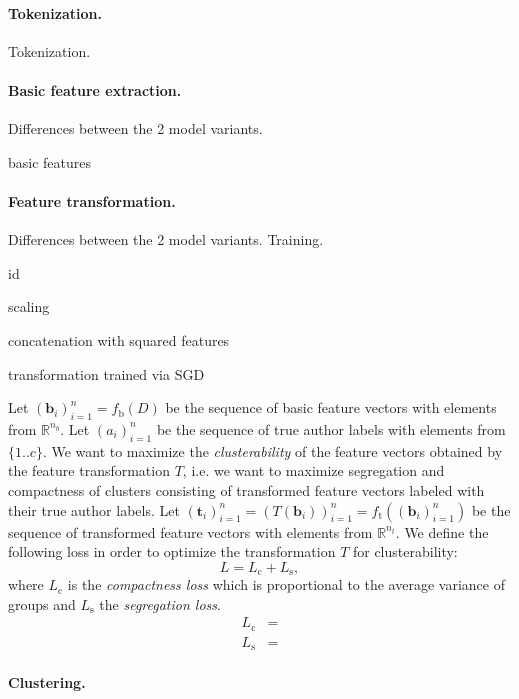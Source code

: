 \documentclass[10pt, a4paper]{article}
\begin{document}
\paragraph{Tokenization.} Tokenization.

\paragraph{Basic feature extraction.} Differences between the 2 model variants.

basic features

\paragraph{Feature transformation.} Differences between the 2 model variants. Training.

id

scaling

concatenation with squared features

transformation trained via SGD

Let $(\mathbf{b}_i)_{i=1}^n = f_\mathrm{b}(D)$ be the sequence of basic feature vectors with elements from $\mathbb{R}^{n_b}$. Let $(a_i)_{i=1}^n$ be the sequence of true author labels with elements from $\{1..c\}$. We want to maximize the \emph{clusterability} of the feature vectors obtained by the feature transformation $T$, i.e. we want to maximize segregation and compactness of clusters consisting of transformed feature vectors labeled with their true author labels. Let $(\mathbf{t}_i)_{i=1}^n = (T(\mathbf{b}_i))_{i=1}^n = f_\mathrm{t}((\mathbf{b}_i)_{i=1}^n)$ be the sequence of transformed feature vectors with elements from $\mathbb{R}^{n_t}$. We define the following loss in order to optimize the transformation $T$ for clusterability:
\begin{equation}
	L = L_\mathrm{c} + L_\mathrm{s},
\end{equation}
where $L_\mathrm{c}$ is the \emph{compactness loss} which is proportional to the average variance of groups and $L_\mathrm{s}$ the \emph{segregation loss}.
\begin{align}
	L_\mathrm{c} &= \\
	L_\mathrm{s} &= 
\end{align} 


\paragraph{Clustering.}
\end{document}
